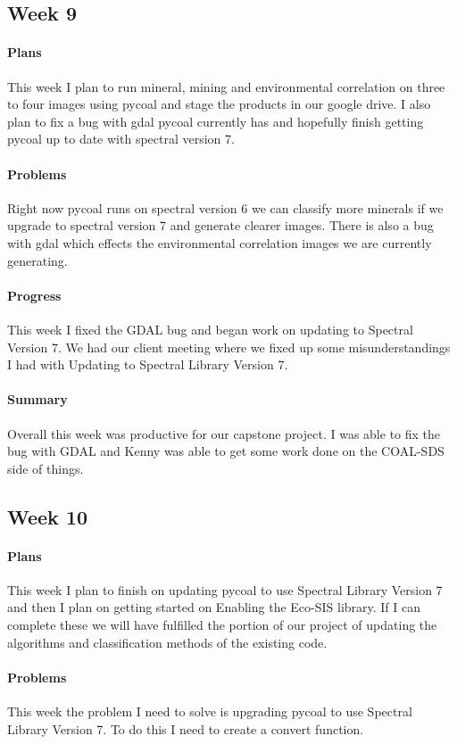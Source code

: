\documentclass{article}
\begin{document}
\subsection{Week 9}
\paragraph{Plans}
This week I plan to run mineral, mining and environmental correlation on three to four images using pycoal and stage the products in our google drive.  I also plan to fix a bug with gdal pycoal currently has and hopefully finish getting pycoal up to date with spectral version 7. 
\paragraph{Problems}
Right now pycoal runs on spectral version 6 we can classify more minerals if we upgrade to spectral version 7 and generate clearer images. There is also a bug with gdal which effects the environmental correlation images we are currently generating. 
\paragraph{Progress}
This week I fixed the GDAL bug and began work on updating to Spectral Version 7. We had our client meeting where we fixed up some misunderstandings I had with Updating to Spectral Library Version 7.  
\paragraph{Summary}
Overall this week was productive for our capstone project. I was able to fix the bug with GDAL and Kenny was able to get some work done on the COAL-SDS side of things. 
\subsection{Week 10}
\paragraph{Plans}
This week I plan to finish on updating pycoal to use Spectral Library Version 7 and then I plan on getting started on Enabling the Eco-SIS library. If I can complete these we will have fulfilled the portion of our project of updating the algorithms and classification methods of the existing code.
\paragraph{Problems}
This week the problem I need to solve is upgrading pycoal to use Spectral Library Version 7. To do this I need to create a convert function. 
\end{document}
